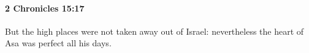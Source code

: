 
		\paragraph{2 Chronicles 15:17} %
			\label{2CHRONICLES-15-17}

			But the high places were not taken away out of Israel: nevertheless the heart of Asa was perfect all his days.


